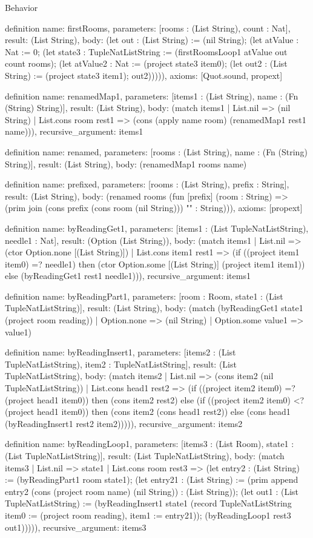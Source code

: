 \begin{lexlean}{Behavior}
\begin{semanticmodule}
definition{
  name: firstRooms,
  parameters: [rooms : (List String), count : Nat],
  result: (List String),
  body: (let out : (List String) := (nil String); (let atValue : Nat := 0; (let state3 : TupleNatListString := (firstRoomsLoop1 atValue out count rooms); (let atValue2 : Nat := (project state3 item0); (let out2 : (List String) := (project state3 item1); out2))))),
  axioms: [Quot.sound, propext]
}

definition{
  name: renamedMap1,
  parameters: [items1 : (List String), name : (Fn (String) String)],
  result: (List String),
  body: (match items1
    | List.nil => (nil String)
    | List.cons room rest1 => (cons (apply name room) (renamedMap1 rest1 name))),
  recursive_argument: items1
}

definition{
  name: renamed,
  parameters: [rooms : (List String), name : (Fn (String) String)],
  result: (List String),
  body: (renamedMap1 rooms name)
}

definition{
  name: prefixed,
  parameters: [rooms : (List String), prefix : String],
  result: (List String),
  body: (renamed rooms (fun [prefix] (room : String) => (prim join (cons prefix (cons room (nil String))) "" : String))),
  axioms: [propext]
}

definition{
  name: byReadingGet1,
  parameters: [items1 : (List TupleNatListString), needle1 : Nat],
  result: (Option (List String)),
  body: (match items1
    | List.nil => (ctor Option.none [(List String)])
    | List.cons item1 rest1 => (if ((project item1 item0) =? needle1) then (ctor Option.some [(List String)] (project item1 item1)) else (byReadingGet1 rest1 needle1))),
  recursive_argument: items1
}

definition{
  name: byReadingPart1,
  parameters: [room : Room, state1 : (List TupleNatListString)],
  result: (List String),
  body: (match (byReadingGet1 state1 (project room reading))
    | Option.none => (nil String)
    | Option.some value1 => value1)
}

definition{
  name: byReadingInsert1,
  parameters: [items2 : (List TupleNatListString), item2 : TupleNatListString],
  result: (List TupleNatListString),
  body: (match items2
    | List.nil => (cons item2 (nil TupleNatListString))
    | List.cons head1 rest2 => (if ((project item2 item0) =? (project head1 item0)) then (cons item2 rest2) else (if ((project item2 item0) <? (project head1 item0)) then (cons item2 (cons head1 rest2)) else (cons head1 (byReadingInsert1 rest2 item2))))),
  recursive_argument: items2
}

definition{
  name: byReadingLoop1,
  parameters: [items3 : (List Room), state1 : (List TupleNatListString)],
  result: (List TupleNatListString),
  body: (match items3
    | List.nil => state1
    | List.cons room rest3 => (let entry2 : (List String) := (byReadingPart1 room state1); (let entry21 : (List String) := (prim append entry2 (cons (project room name) (nil String)) : (List String)); (let out1 : (List TupleNatListString) := (byReadingInsert1 state1 (record TupleNatListString {item0 := (project room reading), item1 := entry21})); (byReadingLoop1 rest3 out1))))),
  recursive_argument: items3
}


\end{semanticmodule}
\end{lexlean}

